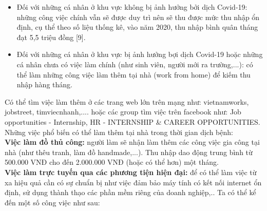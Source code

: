 \begin{itemize}
    \item Đối với những cá nhân ở khu vực không bị ảnh hưởng bởi dịch Covid-19: những công việc chính vẫn sẽ được duy trì nên sẽ thu được mức thu nhập ổn định, cụ thể theo số liệu thống kê, vào năm 2020, thu nhập bình quân tháng đạt 5,5 triệu đồng [9].
    \item Đối với những cá nhân ở khu vực bị ảnh hưởng bợi dịch Covid-19 hoặc những cá nhân chưa có việc làm chính (như sinh viên, người mới ra trường,...): có thể làm những công việc làm thêm tại nhà (work from home) để kiếm thu nhập hàng tháng.
\end{itemize}
Có thể tìm việc làm thêm ở các trang web lớn trên mạng như: vietnamworks, jobstreet, timviecnhanh,.... hoặc các group tìm việc trên facebook như: Job opportunities - Internship, HR - INTERNSHIP & CAREER OPPORTUNITIES.\\
Những việc phổ biến có thể làm thêm tại nhà trong thời gian dịch bệnh:\\
\textbf{Việc làm đồ thủ công:} người làm sẽ nhận làm thêm các công việc gia công tại nhà (như thêu tranh, làm đồ handmade,...). Thu nhập dao động trung bình từ 500.000 VNĐ cho đến 2.000.000 VNĐ (hoặc có thể hơn) một tháng.\\
\textbf{Việc làm trực tuyến qua các phương tiện hiện đại:} để có thể làm việc từ xa hiệu quả cần có sự chuẩn bị như việc đảm bảo máy tính có kết nối internet ổn định, sử dụng thành thạo các phần mềm riêng của doanh nghiệp,.. Ta có thể kể đến một số công việc như sau:
